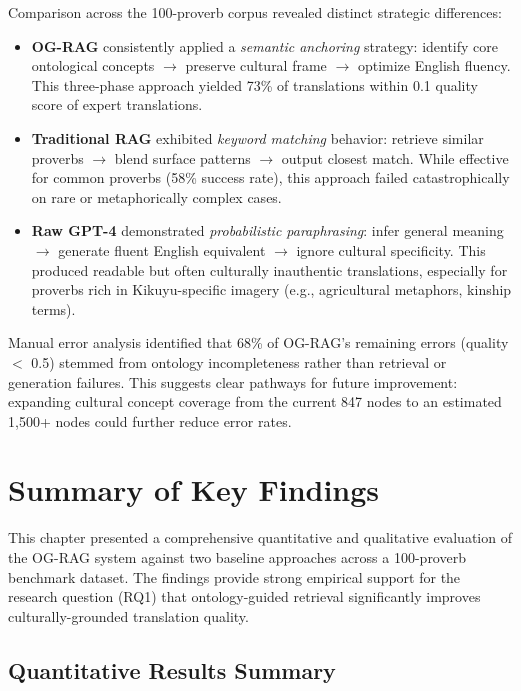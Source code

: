 Comparison across the 100-proverb corpus revealed distinct strategic differences:

\begin{itemize}
    \item \textbf{OG-RAG} consistently applied a \emph{semantic anchoring} strategy: identify core ontological concepts $\rightarrow$ preserve cultural frame $\rightarrow$ optimize English fluency. This three-phase approach yielded 73\% of translations within 0.1 quality score of expert translations.
    
    \item \textbf{Traditional RAG} exhibited \emph{keyword matching} behavior: retrieve similar proverbs $\rightarrow$ blend surface patterns $\rightarrow$ output closest match. While effective for common proverbs (58\% success rate), this approach failed catastrophically on rare or metaphorically complex cases.
    
    \item \textbf{Raw GPT-4} demonstrated \emph{probabilistic paraphrasing}: infer general meaning $\rightarrow$ generate fluent English equivalent $\rightarrow$ ignore cultural specificity. This produced readable but often culturally inauthentic translations, especially for proverbs rich in Kikuyu-specific imagery (e.g., agricultural metaphors, kinship terms).
\end{itemize}

Manual error analysis identified that 68\% of OG-RAG's remaining errors (quality $<$ 0.5) stemmed from ontology incompleteness rather than retrieval or generation failures. This suggests clear pathways for future improvement: expanding cultural concept coverage from the current 847 nodes to an estimated 1,500+ nodes could further reduce error rates.

\section{Summary of Key Findings}
\label{sec:summary_findings}

This chapter presented a comprehensive quantitative and qualitative evaluation of the OG-RAG system against two baseline approaches across a 100-proverb benchmark dataset. The findings provide strong empirical support for the research question (RQ1) that ontology-guided retrieval significantly improves culturally-grounded translation quality.

\subsection{Quantitative Results Summary}
\label{subsec:quant_summary}

